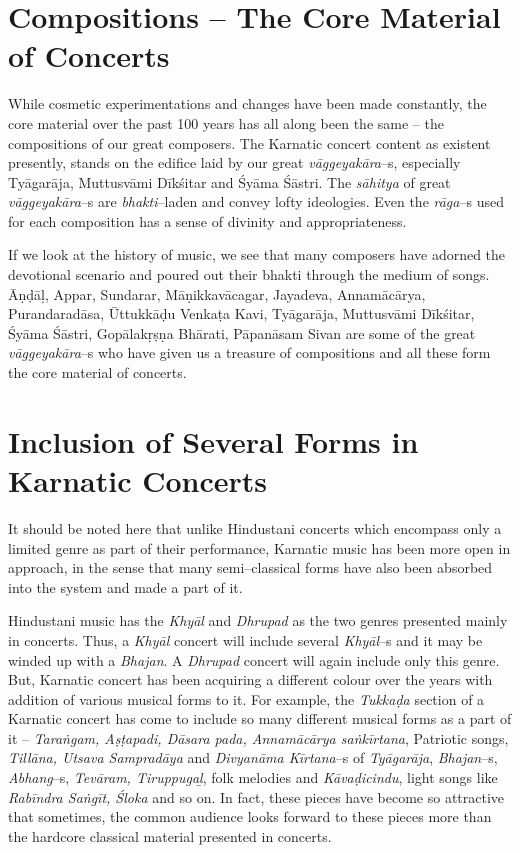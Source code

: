 \section*{Compositions – The Core Material of Concerts}

While cosmetic experimentations and changes have been made constantly, the core material over the past 100 years has all along been the same – the compositions of our great composers. The Karnatic concert content as existent presently, stands on the edifice laid by our great \textit{vāggeyakāra}–s, especially Tyāgarāja, Muttusvāmi Dīkśitar and Śyāma Śāstri. The \textit{sāhitya} of great \textit{vāggeyakāra}–s are \textit{bhakti}–laden and convey lofty ideologies. Even the \textit{rāga}–s used for each composition has a sense of divinity and appropriateness.

If we look at the history of music, we see that many composers have adorned the devotional scenario and poured out their bhakti through the medium of songs. Āṇḍāḷ, Appar, Sundarar, Māṇikkavācagar, Jayadeva, Annamācārya, Purandaradāsa, Ūttukkāḍu Venkaṭa Kavi, Tyāgarāja, Muttusvāmi Dīkśitar, Śyāma Śāstri, Gopālakṛṣṇa Bhārati, Pāpanāsam Sivan are some of the great \textit{vāggeyakāra}–s who have given us a treasure of compositions and all these form the core material of concerts.

\vspace{-.3cm}

\section*{Inclusion of Several Forms in Karnatic Concerts}

It should be noted here that unlike Hindustani concerts which encompass only a limited genre as part of their performance, Karnatic music has been more open in approach, in the sense that many semi–classical forms have also been absorbed into the system and made a part of it.

Hindustani music has the \textit{Khyāl} and \textit{Dhrupad} as the two genres presented mainly in concerts. Thus, a \textit{Khyāl} concert will include several \textit{Khyāl}–s and it may be winded up with a \textit{Bhajan}. A \textit{Dhrupad} concert will again include only this genre. But, Karnatic concert has been acquiring a different colour over the years with addition of various musical forms to it. For example, the \textit{Tukkaḍa} section of a Karnatic concert has come to include so many different musical forms as a part of it – \textit{Taraṅgam, Aṣṭapadi, Dāsara pada, Annamācārya saṅkīrtana}, Patriotic songs, \textit{Tillāna, Utsava Sampradāya} and \textit{Divyanāma Kīrtana}–s of \textit{Tyāgarāja}, \textit{Bhajan}–s, \textit{Abhang}–s, \textit{Tevāram, Tiruppugaḻ}, folk melodies and \textit{Kāvaḍicindu}, light songs like \textit{Rabīndra Saṅgīt, Śloka} and so on. In fact, these pieces have become so attractive that sometimes, the common audience looks forward to these pieces more than the hardcore classical material presented in concerts.

